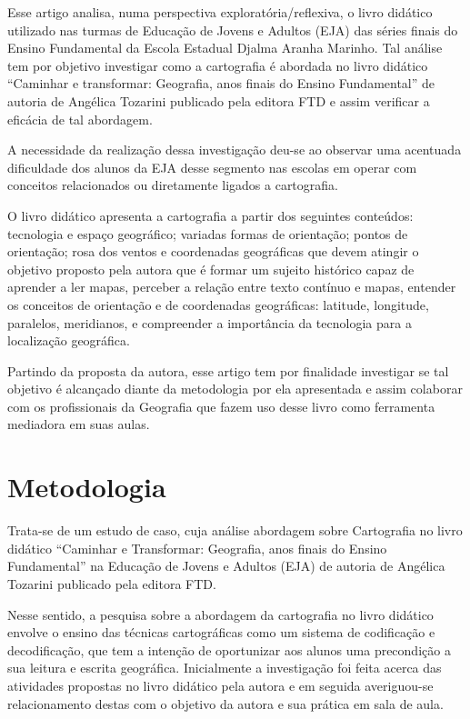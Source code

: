 \begin{refsection}
    Esse artigo analisa, numa perspectiva exploratória/reflexiva, o livro didático utilizado nas turmas de Educação de Jovens e Adultos (EJA) das séries finais do Ensino Fundamental da Escola Estadual Djalma Aranha Marinho. Tal análise tem por objetivo investigar como a cartografia é abordada no livro didático “Caminhar e transformar: Geografia, anos finais do Ensino Fundamental” de autoria de Angélica Tozarini publicado pela editora FTD e assim verificar a eficácia de tal abordagem.  

    A necessidade da realização dessa investigação deu-se ao observar uma acentuada dificuldade dos alunos da EJA desse segmento nas escolas em operar com conceitos relacionados ou diretamente ligados a cartografia. 

    O livro didático apresenta a cartografia a partir dos seguintes conteúdos: tecnologia e espaço geográfico; variadas formas de orientação; pontos de orientação; rosa dos ventos e coordenadas geográficas que devem atingir o objetivo proposto pela autora que é formar um sujeito histórico capaz de aprender a ler mapas, perceber a relação entre texto contínuo e mapas, entender os conceitos de orientação e de coordenadas geográficas: latitude, longitude, paralelos, meridianos, e compreender a importância da tecnologia para a localização geográfica.  

    Partindo da proposta da autora, esse artigo tem por finalidade investigar se tal objetivo é alcançado diante da metodologia por ela apresentada e assim colaborar com os profissionais da Geografia que fazem uso desse livro como ferramenta mediadora em suas aulas. 


    \section{Metodologia}

    Trata-se de um estudo de caso, cuja análise abordagem sobre Cartografia no livro didático “Caminhar e Transformar: Geografia, anos finais do Ensino Fundamental” na Educação de Jovens e Adultos (EJA) de autoria de Angélica Tozarini publicado pela editora FTD.  

    Nesse sentido, a pesquisa sobre a abordagem da cartografia no livro didático envolve o ensino das técnicas cartográficas como um sistema de codificação e decodificação, que tem a intenção de oportunizar aos alunos uma precondição a sua leitura e escrita geográfica. Inicialmente a investigação foi feita acerca das atividades propostas no livro didático pela autora e em seguida averiguou-se relacionamento destas com o objetivo da autora e sua prática em sala de aula. 



\end{refsection}
